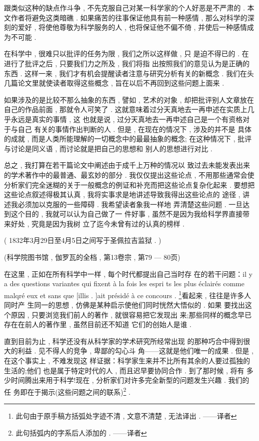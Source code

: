 跟类似这种的缺点作斗争 , 不先克服自己对某一科学家的个人好恶是不严肃的 . 本文作者将避免这类暗礁 . 如果痛苦的往事保证他具有前一种感情 , 那么对科学的深刻的爱好 , 将使他尊敬为科学服务的人 , 也将保证他不偏不倚 , 并使后一种感情成为不可能 . 

在科学中 , 很难只以批评的任务为限 , 我们之所以这样做 , 只 是迫不得已的 . 在进行了批评之后 , 只要我们力之所及 , 我们将指 出按照我们的意见认为是正确的东西 . 这样一来 , 我们才有机会提醒读者注意与研究分析有关的新概念 . 我们在头几篇论文里就使读者取得这些概念 , 旨在以后不再回到这些问题上面来 . 

如果涉及的是比较不那么抽象的东西 , 譬如 , 艺术的对象 , 却把批评别人文章放在自己的作品前面 , 那就令人可笑了 . 这就意味着过分天真地去一再申述在实质上几乎永远是真实的事情 , 这 也就是说 , 过分天真地去一再申述自己是一个有资格对于与自己 有关的事情作出判断的人 . 但是 , 在现在的情况下 , 涉及的并不是 具体的成就 , 而是人类所能理解的一切概念中的最最抽象的概念; 在这种情况下 , 批评与讨论是同义语 , 而讨论就是把自己的思想和 别人的思想进行对比 . 

总之 , 我打算在若干篇论文中阐述由于成千上万种的情况以 致过去未能发表出来的学术著作中的最普通、最玄妙的部分 . 我仅仅提出这些论点 , 不用那些通常会使分析家们完全迷糊的关于一般概念的例证和补充而把这些论点复杂化起来 . 要想把这些论点叙述得极其认真 , 我将实事求是地讲述导致我得出这些论点的 途径 , 讲述我必须加以克服的一些障碍 . 我希望读者象我一样地 弄清楚这些问题 . 一旦达到这个目的 , 我就可以认为自己做了一 件好事 , 虽然不是因为我给科学界直接带来好处 , 究竟是因为我树 立了迄今未曾有过的认真的榜样 . 

\begin{flushright}
	( 1832年3月29日至4月5日之间写于圣佩拉吉监狱 . )
\end{flushright}

\begin{center}
	(科学院图书馆 , 伽罗瓦的全档 ,  第13卷宗 , 第79 — 80页)
\end{center}

在这里 , 正如在所有科学中一样 , 每个时代都提出自己当时存 在的若干问题：il y a des questions variantes qui fixent à la fois les espri ts les plus éclairés comme malqré eux et sans que [illis .  ]ait présidé à ce concours . \footnote{此句由于原手稿方括弧处字迹不清 , 文意不清楚 , 无法译出 . ——译者}看起来 , 往往是许多人同时产 生同一的思想 , 仿佛是某种启示使他们同时恍然大悟似的 . 如果 要找出这个原因 , 只要浏览我们前人的著作 , 就很容易把它发现出 来;那些同样的概念早已存在在前人的著作里 , 虽然目前还不知道 它们的创始人是谁 . 

直到目前为止 , 科学还没有从科学家的学术研究所经常出现 的那种巧合中得到很大的利益 . 见不得人的竞争 , 卑鄙的勾心斗 角——这就是他们唯一的成果 . 但是 , 在这个事实上 , 不难发现这 样证据：科学家生来并不比所有其余的人要过孤独的生活的;他们 也是属于特定时代的人 , 而且迟早要协同合作 . 到了那时候 , 将有 多少时间腾出来用于科学!现在 , 分析家们对许多完全新型的问题发生兴趣 . 我们的任 务即在于揭示(这些问题之间的联系)\footnote{此句括弧内的字系后人添加的 . ——译者} . 

